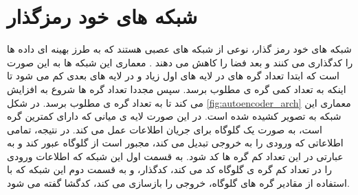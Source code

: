 \section{شبکه های خود رمزگذار}

شبکه های خود رمز گذار، نوعی از شبکه های عصبی هستند که به طرز بهینه ای داده ها را کدگذاری می کنند و بعد فضا را کاهش می دهند
\cite{pmlr-v27-baldi12a}.
معماری این شبکه ها به این صورت است که ابتدا تعداد گره های در لایه های اول زیاد و در لایه های بعدی کم می شود تا اینکه به تعداد کمی گره ی مطلوب برسد. سپس مجددا تعداد گره ها شروع به افزایش می کند تا به تعداد گره ی مطلوب برسد. در شکل
\ref{fig:autoencoder_arch}
معماری این شبکه به تصویر کشیده شده است.
در این صورت لایه ی میانی که دارای کمترین گره است، به صورت یک گلوگاه برای جریان اطلاعات عمل می کند. در نتیجه،‌ تمامی اطلاعاتی که ورودی را به خروجی تبدیل می کند،‌ مجبور است از گلوگاه عبور کند و به عبارتی در این تعداد کم گره ها کد شود. به قسمت اول این شبکه که اطلاعات ورودی را در تعداد کم گره ی گلوگاه کد می کند، کدگذار، و به قسمت دوم این شبکه که با استفاده از مقادیر گره های گلوگاه، خروجی را بازسازی می کند،‌ کدگشا گفته می شود.
